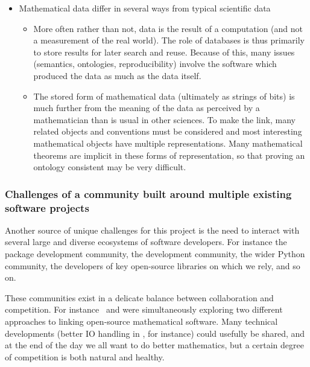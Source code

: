 \begin{itemize}
\item Mathematical data differ in several ways from typical
  scientific data
  \begin{itemize}
  \item More often rather than not, data is the result of a computation (and
    not a measurement of the real world). The role of databases is thus primarily
    to store results for later search and reuse. 
    Because of this, many issues (semantics, ontologies,
    reproducibility) involve the software which produced the data as
    much as the data itself.
  \item The stored form of mathematical data (ultimately as strings of
    bits) is much further from the meaning of the data as perceived
    by a mathematician than is usual in other sciences. To make the
    link, many related objects and conventions must be considered and
    most interesting mathematical objects have multiple
    representations. Many mathematical theorems are implicit in these
    forms of representation, so that proving an ontology consistent
    may be very difficult.
  \end{itemize}
\end{itemize}

\subsubsection{Challenges of a community built around multiple
  existing software projects}

Another source of unique challenges for this project is the need to
interact with several large and diverse ecosystems of software
developers. For instance the \GAP package development community, the
\Sage development community, the wider Python community, the developers
of key open-source libraries on which we rely, and so on.

These communities exist in a delicate balance between collaboration
and competition. For instance \scienceproject\ and \Sage were
simultaneously exploring two different approaches to linking
open-source mathematical software. Many technical developments (better
IO handling in \GAP, for instance) could usefully be shared, and at
the end of the day we all want to do better mathematics, but a certain
degree of competition is both natural and healthy.

